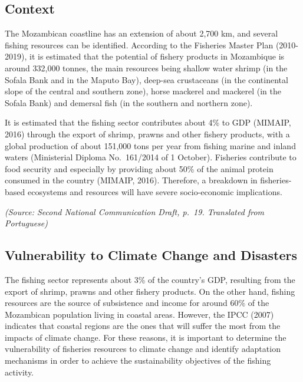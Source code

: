 \documentclass[
]{book}
\begin{document}
\hypertarget{context-1}{%
\subsection{Context}\label{context-1}}

The Mozambican coastline has an extension of about 2,700 km, and several fishing resources can be identified. According to the Fisheries Master Plan (2010-2019), it is estimated that the potential of fishery products in Mozambique is around 332,000 tonnes, the main resources being shallow water shrimp (in the Sofala Bank and in the Maputo Bay), deep-sea crustaceans (in the continental slope of the central and southern zone), horse mackerel and mackerel (in the Sofala Bank) and demersal fish (in the southern and northern zone).

It is estimated that the fishing sector contributes about 4\% to GDP (MIMAIP, 2016) through the export of shrimp, prawns and other fishery products, with a global production of about 151,000 tons per year from fishing marine and inland waters (Ministerial Diploma No.~161/2014 of 1 October). Fisheries contribute to food security and especially by providing about 50\% of the animal protein consumed in the country (MIMAIP, 2016). Therefore, a breakdown in fisheries-based ecosystems and resources will have severe socio-economic implications.

\emph{(Source: Second National Communication Draft, p.~19. Translated from Portuguese)}

\hypertarget{vulnerability-to-climate-change-and-disasters-1}{%
\subsection{Vulnerability to Climate Change and Disasters}\label{vulnerability-to-climate-change-and-disasters-1}}

The fishing sector represents about 3\% of the country's GDP, resulting from the export of shrimp, prawns and other fishery products. On the other hand, fishing resources are the source of subsistence and income for around 60\% of the Mozambican population living in coastal areas. However, the IPCC (2007) indicates that coastal regions are the ones that will suffer the most from the impacts of climate change. For these reasons, it is important to determine the vulnerability of fisheries resources to climate change and identify adaptation mechanisms in order to achieve the sustainability objectives of the fishing activity.
\end{document}
